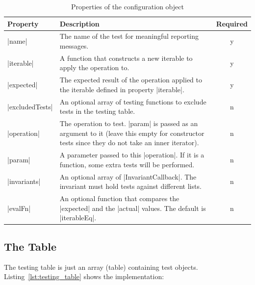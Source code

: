 \begin{table}[H]
  \center
  \begin{tabular}{ l m{10cm} c}
    \textbf{Property} & \textbf{Description} & \textbf{Required}\\
    \hline
    |name|            & The name of the test for meaningful 
                      reporting messages. 
                    & y 
                    \\ 
    |iterable|        & A function that constructs a new iterable to apply the 
                      operation to. 
                    & y 
                    \\  
    |expected|        & The expected result of the operation applied to the iterable
                      defined in property |iterable|.
                    & 
                    y  \\ 
    |excludedTests|   & An optional array of testing functions to exclude tests
                      in the testing table. 
                    & n 
                    \\
    |operation|       & The operation to test. |param| is passed as an argument
                      to it
                     (leave this empty for constructor 
                      tests since they do not take an inner iterator). 
                    & n 
                    \\
    |param|           & A parameter passed to this |operation|. If it is a
                      function, some extra tests will be performed. 
                    & n
                    \\ 
    |invariants|      & An optional array of |InvariantCallback|. The invariant 
                      must hold tests against different lists. 
                    & n
                    \\
    |evalFn|          & An optional function that compares the |expected| and 
                      the |actual| values. The default is |iterableEq|.
                    & n 
                    \\
  \end{tabular}
  \caption{Properties of the configuration object}
\label{tab:testing_table}
\end{table}

\subsection{The Table}
\label{sub:The Table}
The testing table is just an array (table) containing test objects.
Listing~\ref{lst:testing_table} shows the implementation:

